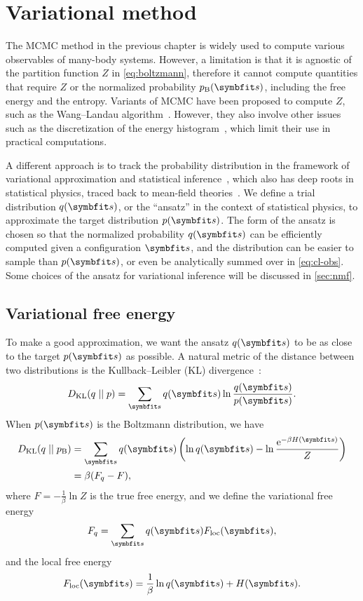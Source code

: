 \chapter{Variational method}
\label{ch:cl-var}

The MCMC method in the previous chapter is widely used to compute various observables of many-body systems. However, a limitation is that it is agnostic of the partition function $Z$ in \cref{eq:boltzmann}, therefore it cannot compute quantities that require $Z$ or the normalized probability $p_\text{B}(\vs)$, including the free energy and the entropy. Variants of MCMC have been proposed to compute $Z$, such as the Wang--Landau algorithm~\cite{wang2001efficient, landau2021guide5}. However, they also involve other issues such as the discretization of the energy histogram~\cite{belardinelli2007wang}, which limit their use in practical computations.

A different approach is to track the probability distribution in the framework of variational approximation and statistical inference~\cite{jordan1999introduction, mackay2003information}, which also has deep roots in statistical physics, traced back to mean-field theories~\cite{chaikin1995principles4, zdeborova2016statistical}. We define a trial distribution $q(\vs)$, or the ``ansatz'' in the context of statistical physics, to approximate the target distribution $p(\vs)$. The form of the ansatz is chosen so that the normalized probability $q(\vs)$ can be efficiently computed given a configuration $\vs$, and the distribution can be easier to sample than $p(\vs)$, or even be analytically summed over in \cref{eq:cl-obs}. Some choices of the ansatz for variational inference will be discussed in \cref{sec:nmf}.

\section{Variational free energy}

To make a good approximation, we want the ansatz $q(\vs)$ to be as close to the target $p(\vs)$ as possible. A natural metric of the distance between two distributions is the Kullback--Leibler (KL) divergence~\cite{kullback1951information}:
\begin{equation}
D_\text{KL}(q \mid\mid p) = \sum_\vs q(\vs) \ln \frac{q(\vs)}{p(\vs)}.
\end{equation}
When $p(\vs)$ is the Boltzmann distribution, we have
\begin{align}
D_\text{KL}(q \mid\mid p_\text{B}) &= \sum_\vs q(\vs) \left( \ln q(\vs) - \ln \frac{\rme^{-\beta H(\vs)}}{Z} \right) \label{eq:kl} \\
&= \beta (F_q - F), \label{eq:kl-fq}
\end{align}
where $F = -\frac{1}{\beta} \ln Z$ is the true free energy, and we define the variational free energy
\begin{equation}
F_q = \sum_\vs q(\vs) F_\text{loc}(\vs),
\label{eq:fq}
\end{equation}
and the local free energy
\begin{equation}
F_\text{loc}(\vs) = \frac{1}{\beta} \ln q(\vs) + H(\vs).
\label{eq:fq-loc}
\end{equation}

